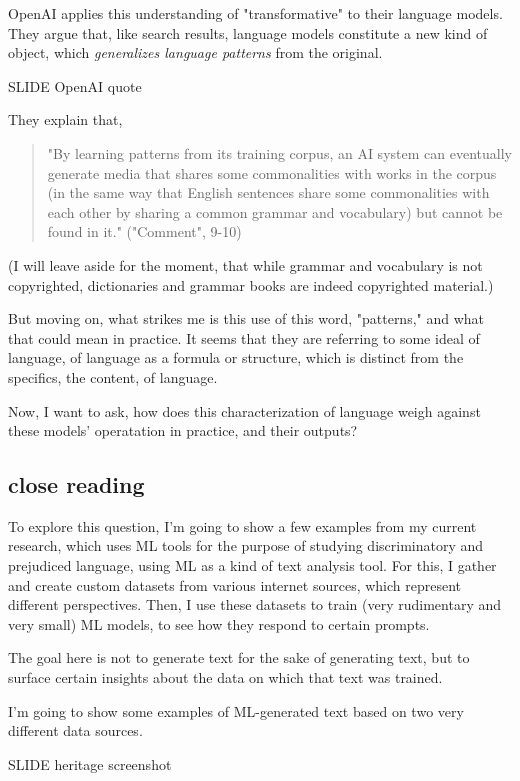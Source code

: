 \documentclass[11pt]{article}
\begin{document}
OpenAI applies this understanding of "transformative" to their
language models. They argue that, like search results, language models
constitute a new kind of object, which \emph{generalizes language patterns}
from the original.

SLIDE OpenAI quote

They explain that,

\begin{quote}
"By learning patterns from its training corpus, an AI system can
eventually generate media that shares some commonalities with works in
the corpus (in the same way that English sentences share some
commonalities with each other by sharing a common grammar and
vocabulary) but cannot be found in it." ("Comment", 9-10)
\end{quote}

(I will leave aside for the moment, that while grammar and vocabulary
is not copyrighted, dictionaries and grammar books are indeed
copyrighted material.)

But moving on, what strikes me is this use of this word, "patterns,"
and what that could mean in practice. It seems that they are referring
to some ideal of language, of language as a formula or structure,
which is distinct from the specifics, the content, of language.

Now, I want to ask, how does this characterization of language weigh
against these models' operatation in practice, and their outputs?

\subsection{close reading}
\label{sec:orga050459}
To explore this question, I'm going to show a few examples from my
current research, which uses ML tools for the purpose of studying
discriminatory and prejudiced language, using ML as a kind of text
analysis tool. For this, I gather and create custom datasets from
various internet sources, which represent different perspectives.
Then, I use these datasets to train (very rudimentary and very small)
ML models, to see how they respond to certain prompts.

The goal here is not to generate text for the sake of generating text,
but to surface certain insights about the data on which that text was
trained.

I'm going to show some examples of ML-generated text based on two very
different data sources.

SLIDE heritage screenshot
\end{document}
